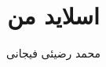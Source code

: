 \documentclass[xcolor=dvipsnames, professionalfont]{beamer}
\author{محمد رضیئی فیجانی}
\title{اسلاید من}
\institute{دانشگاه صنعتی امیرکبیر}
\begin{document}
\frame{\maketitle}

\begin{frame}


\end{frame}
\end{document}
